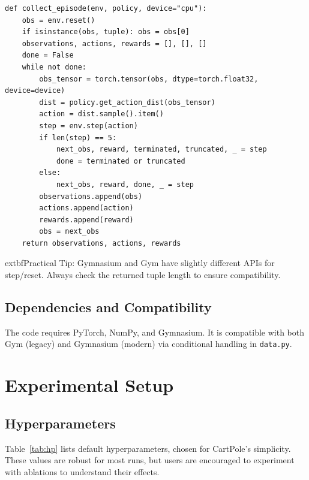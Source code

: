 \documentclass[conference]{IEEEtran}
\begin{document}
\begin{lstlisting}[caption=Episode Collection]
def collect_episode(env, policy, device="cpu"):
    obs = env.reset()
    if isinstance(obs, tuple): obs = obs[0]
    observations, actions, rewards = [], [], []
    done = False
    while not done:
        obs_tensor = torch.tensor(obs, dtype=torch.float32, device=device)
        dist = policy.get_action_dist(obs_tensor)
        action = dist.sample().item()
        step = env.step(action)
        if len(step) == 5:
            next_obs, reward, terminated, truncated, _ = step
            done = terminated or truncated
        else:
            next_obs, reward, done, _ = step
        observations.append(obs)
        actions.append(action)
        rewards.append(reward)
        obs = next_obs
    return observations, actions, rewards
\end{lstlisting}

	extbf{Practical Tip:} Gymnasium and Gym have slightly different APIs for step/reset. Always check the returned tuple length to ensure compatibility.

\subsection{Dependencies and Compatibility}

The code requires PyTorch, NumPy, and Gymnasium. It is compatible with both Gym (legacy) and Gymnasium (modern) via conditional handling in \texttt{data.py}.


\section{Experimental Setup}
\label{sec:experiments}

\subsection{Hyperparameters}

Table~\ref{tab:hp} lists default hyperparameters, chosen for CartPole's simplicity. These values are robust for most runs, but users are encouraged to experiment with ablations to understand their effects.
\end{document}
